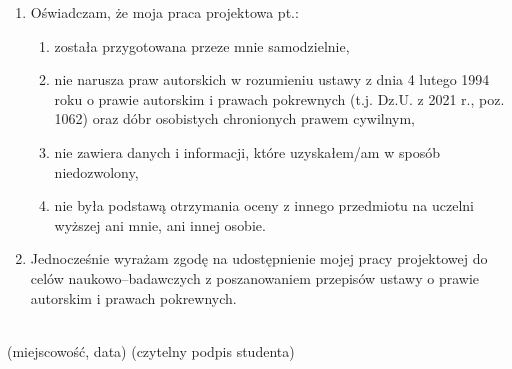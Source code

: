 \begin{enumerate}
    \item Oświadczam, że moja praca projektowa pt.: \@titlePL
          \begin{enumerate}[label=\arabic*)]
              \item została przygotowana przeze mnie samodzielnie,
              \item nie narusza praw autorskich w rozumieniu ustawy z dnia 4 lutego 1994 roku o prawie autorskim i prawach pokrewnych (t.j. Dz.U. z 2021 r., poz. 1062) oraz dóbr osobistych chronionych prawem cywilnym,
              \item nie zawiera danych i informacji, które uzyskałem/am w sposób niedozwolony,
              \item nie była podstawą otrzymania oceny z innego przedmiotu na uczelni wyższej ani mnie, ani innej osobie.
          \end{enumerate}
    \item Jednocześnie wyrażam zgodę na udostępnienie mojej pracy projektowej do celów naukowo--badawczych z poszanowaniem przepisów ustawy o prawie autorskim i prawach pokrewnych.
\end{enumerate}


\vspace*{10mm}

\noindent
\underline{\hspace{6cm}} \hfill \underline{\hspace{6cm}} \\ %
\hspace*{13mm}(miejscowość, data)  \hspace*{63mm}(czytelny podpis studenta)
\vspace*{10mm}

\vfill
\noindent

